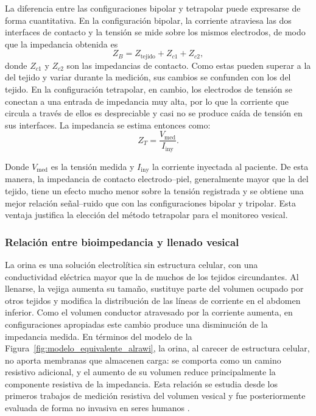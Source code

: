 \documentclass[12pt,a4paper]{article}
\begin{document}
La diferencia entre las configuraciones bipolar y tetrapolar puede expresarse de forma cuantitativa.
En la configuración bipolar, la corriente atraviesa las dos interfaces de contacto y la tensión se
mide sobre los mismos electrodos, de modo que la impedancia obtenida es
\begin{equation}
    Z_{B}=Z_{\mathrm{tejido}}+Z_{c1}+Z_{c2},
\end{equation}
donde $Z_{c1}$ y $Z_{c2}$ son las impedancias de contacto. Como estas pueden superar a la del tejido y
variar durante la medición, sus cambios se confunden con los del tejido. En la configuración
tetrapolar, en cambio, los electrodos de tensión se conectan a una entrada de impedancia muy alta,
por lo que la corriente que circula a través de ellos es despreciable y casi no se produce caída de
tensión en sus interfaces. La impedancia se estima entonces como:
\begin{equation}
    Z_{T}=\frac{V_{\mathrm{med}}}{I_{\mathrm{iny}}}.
\end{equation}

Donde $V_{\mathrm{med}}$ es la tensión medida y $I_{\mathrm{iny}}$ la corriente inyectada al paciente. De esta manera, la impedancia de contacto electrodo--piel, generalmente mayor que la del tejido, tiene
un efecto mucho menor sobre la tensión registrada y se obtiene una mejor relación señal--ruido que con
las configuraciones bipolar y tripolar. Esta ventaja justifica la elección del método tetrapolar para
el monitoreo vesical. 

\subsubsection{Relación entre bioimpedancia y llenado vesical}
\label{sec:bioz_llenado}

La orina es una solución electrolítica sin estructura celular, con una conductividad eléctrica mayor
que la de muchos de los tejidos circundantes. Al llenarse, la vejiga aumenta su tamaño, sustituye
parte del volumen ocupado por otros tejidos y modifica la distribución de las líneas de corriente en
el abdomen inferior. Como el volumen conductor atravesado por la corriente aumenta, en configuraciones
apropiadas este cambio produce una disminución de la impedancia medida. En términos del modelo de la
Figura~\ref{fig:modelo_equivalente_alrawi}, la orina, al carecer de estructura celular, no aporta
membranas que almacenen carga: se comporta como un camino resistivo adicional, y el aumento de su
volumen reduce principalmente la componente resistiva de la impedancia. Esta relación se estudia desde
los primeros trabajos de medición resistiva del volumen vesical y fue posteriormente evaluada de forma
no invasiva en seres humanos \cite{waltz1971bladder,abbey1983bladder,liao2011bladder}.
\end{document}
